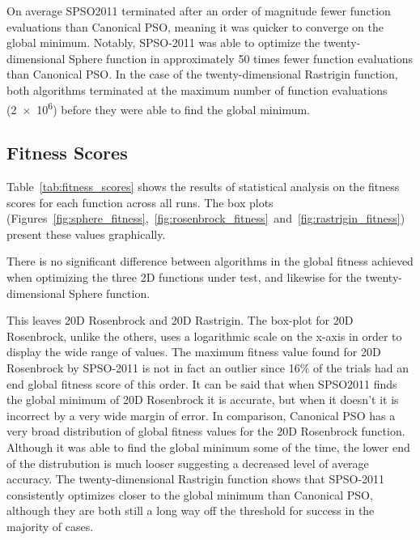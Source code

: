 \documentclass{csfourzero}
\begin{document}
On average SPSO2011 terminated after an order of magnitude fewer function
evaluations than Canonical PSO, meaning it was quicker to converge on the global
minimum. Notably, SPSO-2011 was able to optimize the twenty-dimensional Sphere
function in approximately 50 times fewer function evaluations than Canonical
PSO\@. In the case of the twenty-dimensional Rastrigin function, both algorithms
terminated at the maximum number of function evaluations (\num{2e6}) before they
were able to find the global minimum.

\subsection{Fitness Scores}

Table~\ref{tab:fitness_scores} shows the results of statistical analysis on the
fitness scores for each function across all runs. The box plots
(Figures~\ref{fig:sphere_fitness},~\ref{fig:rosenbrock_fitness}~and~\ref{fig:rastrigin_fitness})
present these values graphically.

There is no significant difference between algorithms in the global fitness
achieved when optimizing the three 2D functions under test, and likewise for the
twenty-dimensional Sphere function.

This leaves 20D Rosenbrock and 20D Rastrigin. The box-plot for 20D Rosenbrock,
unlike the others, uses a logarithmic scale on the x-axis in order to display
the wide range of values. The maximum fitness value found for 20D Rosenbrock by
SPSO-2011 is not in fact an outlier since 16\% of the trials had an end global
fitness score of this order.  It can be said that when SPSO2011 finds the global
minimum of 20D Rosenbrock it is accurate, but when it doesn't it is incorrect by
a very wide margin of error. In comparison, Canonical PSO has a very broad
distribution of global fitness values for the 20D Rosenbrock function. Although
it was able to find the global minimum some of the time, the lower end of the
distrubution is much looser suggesting a decreased level of average accuracy.
The twenty-dimensional Rastrigin function shows that SPSO-2011 consistently
optimizes closer to the global minimum than Canonical PSO, although they are
both still a long way off the threshold for success in the majority of cases.
\end{document}
